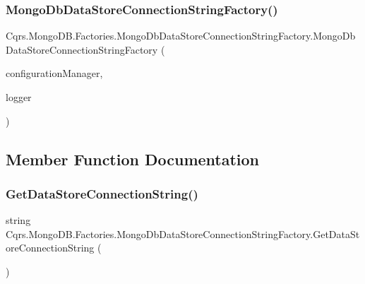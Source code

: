 \subsubsection{\texorpdfstring{Mongo\+Db\+Data\+Store\+Connection\+String\+Factory()}{MongoDbDataStoreConnectionStringFactory()}}
{\footnotesize\ttfamily Cqrs.\+Mongo\+D\+B.\+Factories.\+Mongo\+Db\+Data\+Store\+Connection\+String\+Factory.\+Mongo\+Db\+Data\+Store\+Connection\+String\+Factory (\begin{DoxyParamCaption}\item[{\hyperlink{interfaceCqrs_1_1Configuration_1_1IConfigurationManager}{I\+Configuration\+Manager}}]{configuration\+Manager,  }\item[{I\+Logger}]{logger }\end{DoxyParamCaption})}



\subsection{Member Function Documentation}
\mbox{\label{classCqrs_1_1MongoDB_1_1Factories_1_1MongoDbDataStoreConnectionStringFactory_a76986fcc9521c87bfbb6e417ef13cd53_a76986fcc9521c87bfbb6e417ef13cd53}} 
\subsubsection{\texorpdfstring{Get\+Data\+Store\+Connection\+String()}{GetDataStoreConnectionString()}}
{\footnotesize\ttfamily string Cqrs.\+Mongo\+D\+B.\+Factories.\+Mongo\+Db\+Data\+Store\+Connection\+String\+Factory.\+Get\+Data\+Store\+Connection\+String (\begin{DoxyParamCaption}{ }\end{DoxyParamCaption})}



